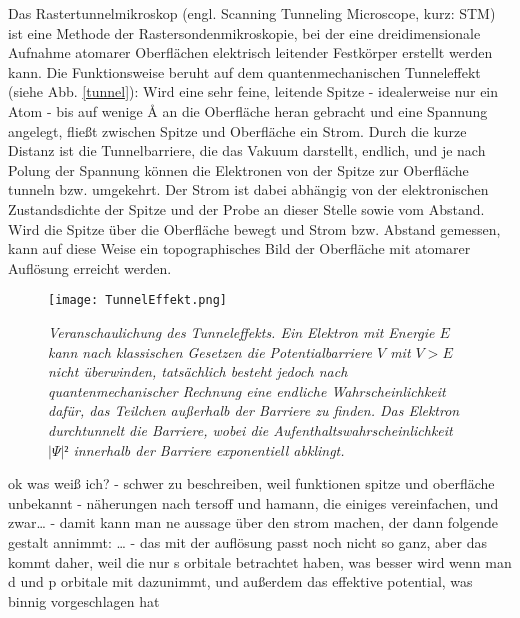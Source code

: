 Das Rastertunnelmikroskop (engl. Scanning Tunneling Microscope, kurz: STM) ist eine Methode der
Rastersondenmikroskopie, bei der eine dreidimensionale Aufnahme atomarer Oberflächen elektrisch
leitender Festkörper erstellt werden kann. Die Funktionsweise beruht auf dem quantenmechanischen
Tunneleffekt (siehe Abb. \ref{tunnel}): Wird eine sehr feine, leitende Spitze - idealerweise nur ein
Atom - bis auf wenige {\AA} an die Oberfläche heran gebracht und eine Spannung angelegt, fließt zwischen Spitze und
Oberfläche ein Strom. Durch die kurze Distanz ist die Tunnelbarriere, die das Vakuum darstellt,
endlich, und je nach Polung der Spannung können die Elektronen von der Spitze zur Oberfläche tunneln bzw.
umgekehrt. Der Strom ist dabei abhängig von der elektronischen Zustandsdichte der Spitze und der
Probe an dieser Stelle sowie vom Abstand. Wird die Spitze über die Oberfläche bewegt und Strom bzw.
Abstand gemessen, kann auf diese Weise ein topographisches Bild der Oberfläche mit atomarer
Auflösung erreicht werden.\\
\begin{figure}[H]
\captionsetup{format=plain}
\centering
\texttt{[image: TunnelEffekt.png]}
\caption{\textit{Veranschaulichung des Tunneleffekts. Ein Elektron mit Energie $E$ kann nach
klassischen Gesetzen die Potentialbarriere $V$ mit $V>E$ nicht überwinden, tatsächlich besteht
jedoch nach quantenmechanischer Rechnung eine endliche Wahrscheinlichkeit dafür, das Teilchen
außerhalb der Barriere zu finden. Das Elektron durchtunnelt die Barriere, wobei die
Aufenthaltswahrscheinlichkeit $|\Psi|²$ innerhalb der Barriere exponentiell abklingt. }}
\label{stmaufbau}
\end{figure}

 
ok was weiß ich?
- schwer zu beschreiben, weil funktionen spitze und oberfläche unbekannt
- näherungen nach tersoff und hamann, die einiges vereinfachen, und zwar\ldots
- damit kann man ne aussage über den strom machen, der dann folgende gestalt annimmt: \ldots
- das mit der auflösung passt noch nicht so ganz, aber das kommt daher, weil die nur s orbitale
betrachtet haben, was besser wird wenn man d und p orbitale mit dazunimmt, und außerdem das
effektive potential, was binnig vorgeschlagen hat
